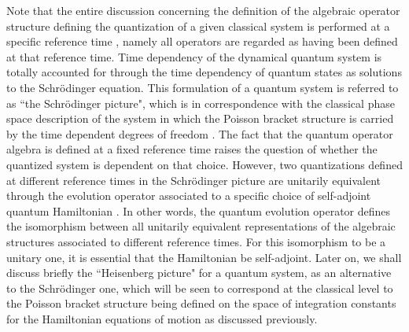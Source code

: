 \documentclass[a4paper,11pt]{article}
\begin{document}
Note that the entire discussion concerning the definition of
the algebraic operator structure defining the quantization of
a given classical system is performed at a specific reference
time \coordHE{}, namely all operators are regarded as having been
defined at that reference time. Time dependency of the dynamical
quantum system is totally accounted for through the time dependency
of quantum states \coordHE{} as solutions to the Schr\"odinger equation.
This formulation of a quantum system is referred to as ``the Schr\"odinger
picture", which is in correspondence with the classical phase space
description of the system in which the Poisson bracket structure is
carried by the time dependent degrees of freedom \coordHE{}.
The fact that the quantum operator algebra is defined at a fixed reference
time \coordHE{} raises the question of whether the quantized system is
dependent on that choice. However, two quantizations defined at different
reference times in the Schr\"odinger picture
are unitarily equivalent through the evolution operator
\coordHE{} associated to a specific choice of self-adjoint
quantum Hamiltonian \coordHE{}. In other words, the quantum evolution
operator defines the isomorphism between all unitarily equivalent
representations of the algebraic structures associated to different
reference times. For this isomorphism to be a unitary one, it is
essential that the Hamiltonian \coordHE{} be self-adjoint.
Later on, we shall discuss briefly the ``Heisenberg picture" for
a quantum system, as an alternative to the Schr\"odinger one,
which will be seen to correspond at the classical level to the
Poisson bracket structure being defined on the space of integration
constants for the Hamiltonian equations of motion as discussed previously.
\end{document}
